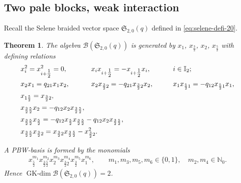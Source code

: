 \documentclass[10pt,a4paper]{amsart}
\numberwithin{equation}{section}
\newtheorem{Theorem}{Theorem}[section]
\newcommand{\GK}{\operatorname{GK-dim}}
\newcommand{\toba}{\mathscr B}
\newcommand{\sele}{\mathfrak{S}}
\newcommand{\I}{{\mathbb I}}
\newcommand{\N}{{\mathbb N}}
\newcommand{\tresdos}{\frac{3}{2}}
\newcommand{\cincodos}{\frac{5}{2}}
\begin{document}
\subsection{Two pale blocks, weak interaction} Recall the Selene braided vector space $\sele_{2,0}(q)$ defined in \eqref{eq:selene-defi-20}.

\begin{Theorem} \label{th:selene-2-0}
The algebra $\toba(\sele_{2,0}(q))$ is generated by $x_1$, $x_{\tresdos}$, $x_2$, $x_\cincodos$ with defining relations
\begin{alignat}{3}
\label{eq:endymion-III-1}
& x_i^2 = x_{i+\tfrac{1}{2}}^2=0, \qquad&&\hspace{-20mm}
x_ix_{i+\tfrac{1}{2}} =-x_{i+\tfrac{1}{2}} x_i, \qquad &&i\in\I_2;
\\ \label{eq:endymion-III-2}
&x_2 x_1=q_{21}x_1 x_2, \qquad&&\hspace{-20mm}
x_2 x_{\tresdos2} = -q_{21} x_{\tresdos2}x_2, \qquad
&&x_1 x_{\cincodos1} = -q_{12} x_{\cincodos1}x_1,
\\ \label{eq:two-pale-def-rel-1}
&x_{1\cincodos} = x_{\tresdos2},
\\
\label{relations-two-pale-blocks-4}
&x_{\tresdos\cincodos}x_{2} = -q_{12} x_{2}x_{\tresdos\cincodos},
\\ \label{relations-two-pale-blocks-5}
& x_{\tresdos\cincodos}x_{\cincodos} = -q_{12} x_{\cincodos}x_{\tresdos\cincodos} - q_{12}x_{2}x_{\tresdos\cincodos},
\\ \label{relations-two-pale-blocks-6}
& x_{\tresdos\cincodos}x_{\tresdos2} = x_{\tresdos2}x_{\tresdos\cincodos} - x_{\tresdos2}^2.
\end{alignat}

A PBW-basis is formed by the monomials
\begin{align}\label{eq:two-pale-PBW-basis}
x_{\cincodos}^{m_1}x_{\tresdos\cincodos}^{m_2}x_{2}^{m_3}x_{\tresdos2}^{m_4} x_{\tresdos}^{m_5} x_1^{m_6},\qquad
 m_1, m_3, m_5, m_6 \in \{0,1\}, \quad m_2, m_4 \in \N_0.
\end{align}
Hence $\GK \toba(\sele_{2,0}(q)) = 2$.
\end{Theorem}
\end{document}
